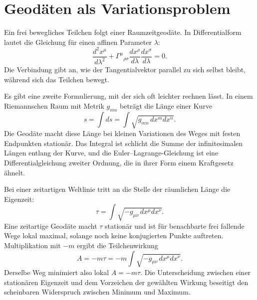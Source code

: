 \begin{classroomqa}
\end{classroomqa}

\section{Geodäten als Variationsproblem}

Ein frei bewegliches Teilchen folgt einer Raumzeitgeodäte. In Differentialform lautet die Gleichung für einen affinen Parameter \(\lambda\):
\begin{equation}
\frac{d^2x^\mu}{d\lambda^2}
+\Gamma^\mu{}_{\rho\sigma}
\frac{dx^\rho}{d\lambda}
\frac{dx^\sigma}{d\lambda}=0.
\label{eq:l5-geodesic}
\end{equation}
Die Verbindung gibt an, wie der Tangentialvektor parallel zu sich selbst bleibt, während sich das Teilchen bewegt.

Es gibt eine zweite Formulierung, mit der sich oft leichter rechnen lässt. In einem Riemannschen Raum mit Metrik \(g_{mn}\) beträgt die Länge einer Kurve
\begin{equation}
s=\int ds
=\int\sqrt{g_{mn}\,dx^m dx^n}.
\label{eq:l5-spatial-length}
\end{equation}
Die Geodäte macht diese Länge bei kleinen Variationen des Weges mit festen Endpunkten stationär. Das Integral ist schlicht die Summe der infinitesimalen Längen entlang der Kurve, und die Euler--Lagrange-Gleichung ist eine Differentialgleichung zweiter Ordnung, die in ihrer Form einem Kraftgesetz ähnelt.

Bei einer zeitartigen Weltlinie tritt an die Stelle der räumlichen Länge die Eigenzeit:
\begin{equation}
\tau
=\int\sqrt{-g_{\mu\nu}\,dx^\mu dx^\nu}.
\label{eq:l5-proper-time-functional}
\end{equation}
Eine zeitartige Geodäte macht \(\tau\) stationär und ist für benachbarte frei fallende Wege lokal maximal, solange noch keine konjugierten Punkte auftreten. Multiplikation mit \(-m\) ergibt die Teilchenwirkung
\begin{equation}
A=-m\tau
=-m\int\sqrt{-g_{\mu\nu}\,dx^\mu dx^\nu}.
\label{eq:l5-particle-action}
\end{equation}
Derselbe Weg minimiert also lokal \(A=-m\tau\). Die Unterscheidung zwischen einer stationären Eigenzeit und dem Vorzeichen der gewählten Wirkung beseitigt den scheinbaren Widerspruch zwischen Minimum und Maximum.

